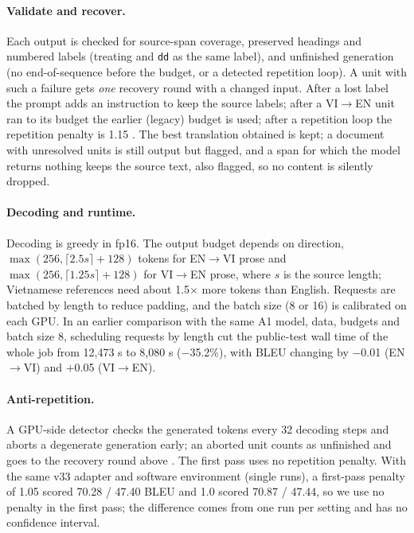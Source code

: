 \paragraph{Validate and recover.}
Each output is checked for source-span coverage, preserved headings and numbered labels (treating  and \texttt{dd} as the same label), and unfinished generation (no end-of-sequence before the budget, or a detected repetition loop).
A unit with such a failure gets \emph{one} recovery round with a changed input.
After a lost label the prompt adds an instruction to keep the source labels; after a VI$\to$EN unit ran to its budget the earlier (legacy) budget is used; after a repetition loop the repetition penalty is 1.15 \citep{keskar2019ctrl}.
The best translation obtained is kept; a document with unresolved units is still output but flagged, and a span for which the model returns nothing keeps the source text, also flagged, so no content is silently dropped.

\paragraph{Decoding and runtime.}
Decoding is greedy in fp16.
The output budget depends on direction, $\max(256,\lceil 2.5s\rceil{+}128)$ tokens for EN$\to$VI prose and $\max(256,\lceil 1.25s\rceil{+}128)$ for VI$\to$EN prose, where $s$ is the source length; Vietnamese references need about 1.5$\times$ more tokens than English.
Requests are batched by length to reduce padding, and the batch size (8 or 16) is calibrated on each GPU.
In an earlier comparison with the same A1 model, data, budgets and batch size 8, scheduling requests by length cut the public-test wall time of the whole job from 12{,}473 s to 8{,}080 s ($-$35.2\%), with BLEU changing by $-$0.01 (EN$\to$VI) and $+$0.05 (VI$\to$EN).

\paragraph{Anti-repetition.}
A GPU-side detector checks the generated tokens every 32 decoding steps and aborts a degenerate generation early; an aborted unit counts as unfinished and goes to the recovery round above \citep{holtzman2020curious}.
The first pass uses no repetition penalty.
With the same v33 adapter and software environment (single runs), a first-pass penalty of 1.05 scored 70.28 / 47.40 BLEU and 1.0 scored 70.87 / 47.44, so we use no penalty in the first pass; the difference comes from one run per setting and has no confidence interval.
